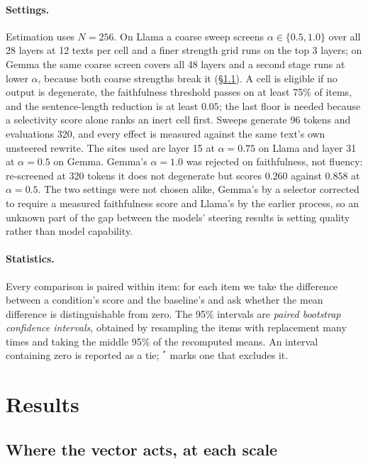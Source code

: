 \documentclass[aps,prb,reprint,nofootinbib,a4paper]{revtex4-2}
\begin{document}
\paragraph{Settings.} Estimation uses $N=256$. On Llama a coarse sweep screens
$\alpha \in \{0.5, 1.0\}$ over all 28 layers at 12 texts per cell and a finer
strength grid runs on the top 3 layers; on Gemma the same coarse screen covers
all 48 layers and a second stage runs at lower $\alpha$, because both coarse
strengths break it (\S\ref{sec:depth}). A cell is eligible if no output is
degenerate, the faithfulness threshold passes on at least 75\% of items, and
the sentence-length reduction is at least $0.05$; the last floor is needed
because a selectivity score alone ranks an inert cell first. Sweeps generate
96 tokens and evaluations 320, and every effect is measured against the same
text's own unsteered rewrite. The sites used are layer 15 at $\alpha=0.75$ on
Llama and layer 31 at $\alpha=0.5$ on Gemma. Gemma's $\alpha=1.0$ was rejected
on faithfulness, not fluency: re-screened at 320 tokens it does not degenerate
but scores $0.260$ against $0.858$ at $\alpha=0.5$. The two settings were not
chosen alike, Gemma's by a selector corrected to require a measured
faithfulness score and Llama's by the earlier process, so an unknown part of
the gap between the models' steering results is setting quality rather than
model capability.

\paragraph{Statistics.} Every comparison is paired within item: for each item
we take the difference between a condition's score and the baseline's and ask
whether the mean difference is distinguishable from zero. The 95\% intervals
are \emph{paired bootstrap confidence intervals}, obtained by resampling the
items with replacement many times and taking the middle 95\% of the recomputed
means. An interval containing zero is reported as a tie; $^*$ marks one that
excludes it.

\section{Results}
\label{sec:results}

\subsection{Where the vector acts, at each scale}
\label{sec:depth}
\end{document}
